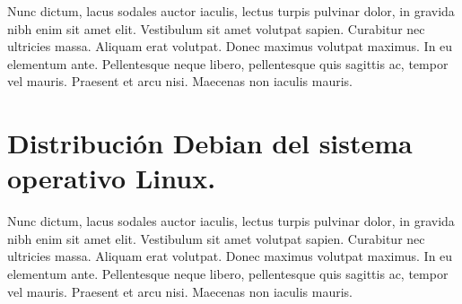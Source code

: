 Nunc dictum, lacus sodales auctor iaculis, lectus turpis pulvinar dolor, in
gravida nibh enim sit amet elit. Vestibulum sit amet volutpat sapien. Curabitur
nec ultricies massa. Aliquam erat volutpat. Donec maximus volutpat maximus. In
eu elementum ante. Pellentesque neque libero, pellentesque quis sagittis ac,
tempor vel mauris. Praesent et arcu nisi. Maecenas non iaculis mauris.

\section{Distribución Debian del sistema operativo Linux.}

Nunc dictum, lacus sodales auctor iaculis, lectus turpis pulvinar dolor, in
gravida nibh enim sit amet elit. Vestibulum sit amet volutpat sapien. Curabitur
nec ultricies massa. Aliquam erat volutpat. Donec maximus volutpat maximus. In
eu elementum ante. Pellentesque neque libero, pellentesque quis sagittis ac,
tempor vel mauris. Praesent et arcu nisi. Maecenas non iaculis mauris.


